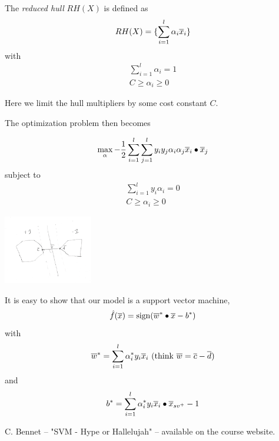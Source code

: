 \documentclass[a4paper,blends,pdf,colorBG,slideColor]{prosper}
\begin{document}
The {\em reduced hull} $RH(X)$ is defined as
\[
RH(X) = \{ \sum_{i=1}^l \alpha_i\overline{x}_i\}
\]
with 
\begin{eqnarray*}
\sum_{i=1}^l\alpha_i = 1\\
C \ge \alpha_i \ge 0
\end{eqnarray*}

Here we limit the hull multipliers by some cost constant $C$.
\es


The optimization problem then becomes

\[
\max_\alpha - \frac{1}{2}\sum_{i=1}^l\sum_{j=1}^l y_i y_j \alpha_i \alpha_j \overline{x}_i \bullet \overline{x}_j
\]
subject to 
\begin{eqnarray*}
\sum_{i=1}^{l} y_i \alpha_i = 0\\
C \ge \alpha_i \ge 0
\end{eqnarray*}


\es


\begin{center}
\includegraphics[height=30mm]{images/hull-4.eps}
\end{center}

It is easy to show that our model is a support vector machine,
\[
\model{f}(\ol{x}) = \sign (\ol{w}^*\bullet\ol{x} -b^*)
\]
with
\begin{equation*}
\overline{w}^* = \sum_{i=1}^l \alpha^*_i y_i  \overline{x}_i \mbox{ (think $\overline{w} = \overline{c} - \overline{d}$)}
\end{equation*}
and
\begin{equation*}
b^*  = \sum_{i=1}^l \alpha^*_i y_i  \overline{x}_i\bullet\overline{x}_{sv^+} - 1
\end{equation*}

\es


C. Bennet -- "SVM - Hype or Hallelujah" -- available on the course website.
\es
\end{document}

